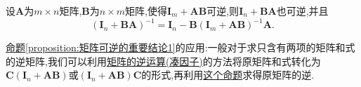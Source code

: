 \documentclass[../../main.tex]{subfiles}%
\begin{document}
\begin{proposition}\label{proposition:矩阵可逆的重要结论1}
设\(\boldsymbol{A}\)为\(m\times n\)矩阵,\(\boldsymbol{B}\)为\(n\times m\)矩阵,使得\(\boldsymbol{I}_{m}+\boldsymbol{AB}\)可逆,则\(\boldsymbol{I}_{n}+\boldsymbol{BA}\)也可逆,并且
\[
(\boldsymbol{I}_{n}+\boldsymbol{BA})^{-1}=\boldsymbol{I}_{n}-\boldsymbol{B}(\boldsymbol{I}_{m}+\boldsymbol{AB})^{-1}\boldsymbol{A}.
\]
\end{proposition}
\begin{note}
\hyperref[proposition:矩阵可逆的重要结论1]{命题\ref{proposition:矩阵可逆的重要结论1}}的应用:一般对于求只含有两项的矩阵和式的逆矩阵,我们可以利用\hyperref[proposition:矩阵的逆运算]{矩阵的逆运算(凑因子)}的方法将原矩阵和式转化为$\boldsymbol{C}\left( \boldsymbol{I}_n+\boldsymbol{AB} \right)$或$\left( \boldsymbol{I}_n+\boldsymbol{AB} \right) \boldsymbol{C}$的形式,再利用\hyperref[proposition:矩阵可逆的重要结论1]{这个命题}求得原矩阵的逆.
\end{note}
\end{document}
